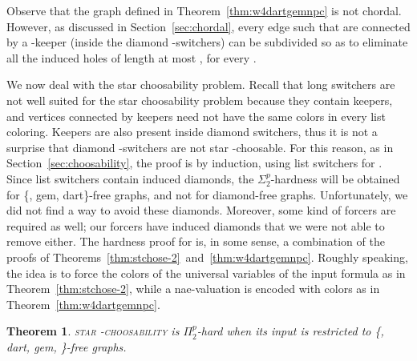 \documentclass[a4paper, 11pt, oneside]{article}
\newtheorem{theorem}{Theorem}
\newcommand{\stchose}[1]{\textsc{star -choosability}}
\newcommand{\ptwop}{\ensuremath{\Pi^p_2}\xspace}
\newcommand{\stp}{\ensuremath{\Sigma^p_2}\xspace}
\begin{document}
Observe that the graph  defined in Theorem~\ref{thm:w4dartgemnpc} is not chordal.  However, as discussed in Section~\ref{sec:chordal}, every edge  such that  are connected by a -keeper (inside the diamond -switchers) can be subdivided so as to eliminate all the induced holes of length at most , for every .

We now deal with the star choosability problem.  Recall that long switchers are not well suited for the star choosability problem because they contain keepers, and vertices connected by keepers need not have the same colors in every list coloring.  Keepers are also present inside diamond switchers, thus it is not a surprise that diamond -switchers are not star -choosable.   For this reason, as in Section~\ref{sec:choosability}, the proof is by induction, using list switchers for .  Since list switchers contain induced diamonds, the \stp-hardness will be obtained for \{, gem, dart\}-free graphs, and not for diamond-free graphs.  Unfortunately, we did not find a way to avoid these diamonds.  Moreover, some kind of forcers are required as well; our forcers have induced diamonds that we were not able to remove either.  The hardness proof for  is, in some sense, a combination of the proofs of Theorems~\ref{thm:stchose-2}~and~\ref{thm:w4dartgemnpc}.  Roughly speaking, the idea is to force the colors of the universal variables of the input formula as in Theorem~\ref{thm:stchose-2}, while a nae-valuation is encoded with colors as in Theorem~\ref{thm:w4dartgemnpc}.

\begin{theorem}\label{thm:w4-dart-gem ptp complete}
  \stchose{2} is \ptwop-hard when its input is restricted to \{, dart, gem, \}-free graphs.
\end{theorem}
\end{document}
